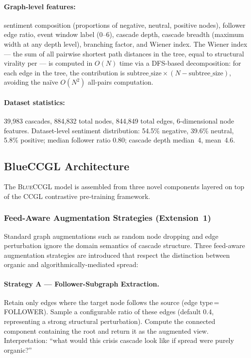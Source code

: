 \documentclass[12pt, a4paper]{article}
\newcommand{\BLUECCGL}{\textsc{BlueCCGL}\xspace}
\begin{document}
\paragraph{Graph-level features:} sentiment composition (proportions of negative, neutral, positive nodes), follower edge ratio, event window label (0--6), cascade depth, cascade breadth (maximum width at any depth level), branching factor, and Wiener index. The Wiener index --- the sum of all pairwise shortest path distances in the tree, equal to structural virality per \citet{goel2016structural} --- is computed in $O(N)$ time via a DFS-based decomposition: for each edge in the tree, the contribution is $\text{subtree\_size} \times (N - \text{subtree\_size})$, avoiding the na\"ive $O(N^2)$ all-pairs computation.

\paragraph{Dataset statistics:} 39,983 cascades, 884,832 total nodes, 844,849 total edges, 6-dimensional node features. Dataset-level sentiment distribution: 54.5\% negative, 39.6\% neutral, 5.8\% positive; median follower ratio 0.80; cascade depth median~4, mean~4.6.

\subsection{BlueCCGL Architecture}
\label{sec:arch}

The \BLUECCGL model is assembled from three novel components layered on top of the CCGL contrastive pre-training framework.

\subsubsection{Feed-Aware Augmentation Strategies (Extension~1)}

Standard graph augmentations such as random node dropping and edge perturbation \citep{you2020graphcl} ignore the domain semantics of cascade structure. Three feed-aware augmentation strategies are introduced that respect the distinction between organic and algorithmically-mediated spread:

\paragraph{Strategy A --- Follower-Subgraph Extraction.} Retain only edges where the target node follows the source (edge type\,=\,FOLLOWER). Sample a configurable ratio of these edges (default 0.4, representing a strong structural perturbation). Compute the connected component containing the root and return it as the augmented view. Interpretation: ``what would this crisis cascade look like if spread were purely organic?''
\end{document}
